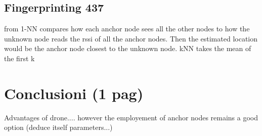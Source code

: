 \documentclass[12pt,twoside]{report}
\begin{document}
\section{Fingerprinting 437}
from \cite{YIU2017235} 1-NN compares how each anchor node sees all the other nodes to how the unknown node reads the rssi of all the anchor nodes. Then the estimated location would be the anchor node closest to the unknown node. kNN takes the mean of the first k 






\chapter{Conclusioni (1 pag)}
Advantages of drone.... however the employement of anchor nodes remains a good option (deduce itself parameters...)








\clearpage
\printbibliography[
heading=bibintoc,
title={Whole bibliography}
]

\clearpage

\printbibliography[heading=subbibintoc,type=article,title={Articles only}]
\end{document}
